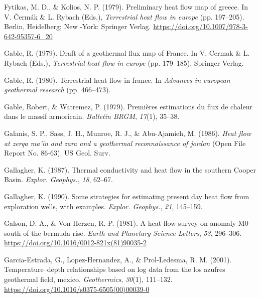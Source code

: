 \documentclass[draft,linenumbers]{agujournal2018}
\begin{document}
\leavevmode{}%
Fytikas, M. D., \& Kolios, N. P. (1979). Preliminary heat flow map of
greece. In V. Čermák \& L. Rybach (Eds.), \emph{Terrestrial heat flow in
europe} (pp. 197--205). Berlin, Heidelberg; New -York: Springer Verlag.
\url{https://doi.org/10.1007/978-3-642-95357-6_20}

\leavevmode{}%
Gable, R. (1979). Draft of a geothermal flux map of {France}. In V.
Cermak \& L. Rybach (Eds.), \emph{Terrestrial heat flow in europe} (pp.
179--185). Springer Verlag.

\leavevmode{}%
Gable, R. (1980). Terrestrial heat flow in france. In \emph{Advances in
european geothermal research} (pp. 466--473).

\leavevmode{}%
Gable, Robert, \& Watremez, P. (1979). Premières estimations du flux de
chaleur dans le massif armoricain. \emph{Bulletin BRGM}, \emph{17}(1),
35--38.

\leavevmode{}%
Galanis, S. P., Sass, J. H., Munroe, R. J., \& Abu-Ajamieh, M. (1986).
\emph{Heat flow at zerqa ma'in and zara and a geothermal reconnaissance
of jordan} (Open File Report No. 86-63). US Geol. Surv.

\leavevmode{}%
Gallagher, K. (1987). Thermal conductivity and heat flow in the southern
{Cooper Basin}. \emph{Explor. Geophys.}, \emph{18}, 62--67.

\leavevmode{}%
Gallagher, K. (1990). Some strategies for estimating present day heat
flow from exploration wells, with examples. \emph{Explor. Geophys.},
\emph{21}, 145--159.

\leavevmode{}%
Galson, D. A., \& Von Herzen, R. P. (1981). A heat flow survey on
anomaly M0 south of the bermuda rise. \emph{Earth and Planetary Science
Letters}, \emph{53}, 296--306.
\url{https://doi.org/10.1016/0012-821x(81)90035-2}

\leavevmode{}%
Garcia-Estrada, G., Lopez-Hernandez, A., \& Prol-Ledesma, R. M. (2001).
Temperature--depth relationships based on log data from the los azufres
geothermal field, mexico. \emph{Geothermics}, \emph{30}(1), 111--132.
\url{https://doi.org/10.1016/s0375-6505(00)00039-0}
\end{document}

